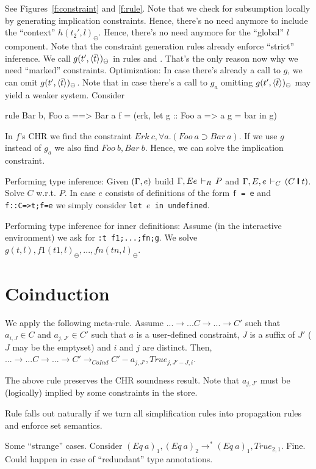 \documentclass{article}
\renewcommand{\implies}[0]{\supset}
\newcommand{\rightarrowtail}{\longrightarrow}
\newcommand{\gd}[0]{~\rule{0.5mm}{2.5mm}~}
\newcommand{\tcons}{\, \vdash_{\scriptsize C} \,}
\newcommand{\tdef}{\, \vdash_{\scriptsize R} \,}
\begin{document}
See Figures~\ref{f:constraint} and \ref{f:rule}.
Note that we check for subsumption locally by generating implication constraints.
Hence, there's no need anymore to include the ``context'' $h(t_2',l)_{\ominus}$.
Hence, there's no need anymore for the ``global'' $l$ component.
Note that the constraint generation rules already enforce ``strict'' inference.
We call $g(t',\langle \bar{t} \rangle)_{\ominus}$ in rules  and .
That's the only reason now why we need ``marked'' constraints.
Optimization: In case there's already a call to $g$, we can omit $g(t',\langle \bar{t} \rangle)_{\ominus}$.
Note that in case there's a call to $g_a$ omitting $g(t',\langle \bar{t} \rangle)_{\ominus}$ may yield
a weaker system.
Consider
\begin{code}
rule Bar b, Foo a ==> Bar a
f = (erk, let g :: Foo a => a
              g = bar
          in g)
\end{code}
%
In $f$'s CHR we find the constraint
$Erk~c, \forall a. (Foo~a \implies Bar~a)$.
If we use $g$ instead of $g_a$ we also find $Foo~b,Bar~b$. Hence, we can solve the implication constraint.

Performing type inference: Given $(\Gamma,e)$ build $\tenv, E e \tdef P$ and $\tenv, E, e \tcons (C \gd t)$.
Solve $C$ w.r.t. $P$. In case $e$ consists of definitions of the form {\tt f = e} and
{\tt f::C=>t;f=e} we simply consider {\tt let $e$ in undefined}.


Performing type inference for inner definitions:
Assume (in the interactive environment) we ask for {\tt :t f1;...;fn;g}.
We solve $g(t,l), f1(t1,l)_{\ominus},...,fn(tn,l)_{\ominus}$.

\section{Coinduction}

We apply the following meta-rule.
Assume $ ... \rightarrowtail ... C \rightarrowtail ... \rightarrowtail C'$
such that $a_{i,J}\in C$ and $a_{j,J'}\in C'$ such that $a$ is a user-defined constraint,
$J$ is a suffix of $J'$ ($J$ may be the emptyset) and $i$ and $j$ are distinct.
Then, $ ... \rightarrowtail ... C \rightarrowtail ... \rightarrowtail C' \rightarrowtail_{CoInd} C'-a_{j,J'}, True_{j,J'-J,i}$.

The above rule preserves the CHR soundness result.
Note that $a_{j,J'}$ must be (logically) implied by some constraints in the store.

Rule falls out naturally if we turn all simplification rules into propagation rules and enforce set semantics.

Some ``strange'' cases. Consider $(Eq~a)_1, (Eq~a)_2 \rightarrowtail^* (Eq~a)_1, True_{2,1}$.
Fine. Could happen in case of ``redundant'' type annotations.
\end{document}
